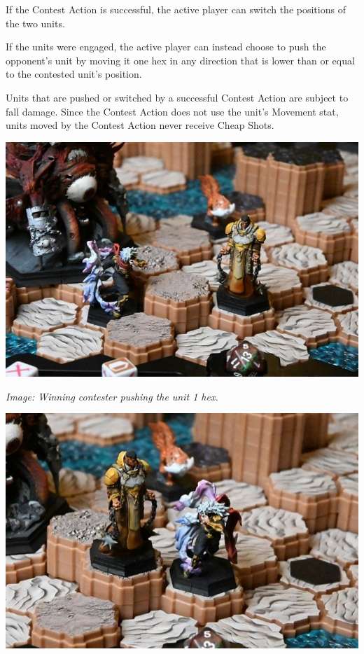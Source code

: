 \documentclass[../main.tex]{subfiles}
\begin{document}
If the Contest Action is successful, the active player can switch the positions of the two units. 

If the units were engaged, the active player can instead choose to push the opponent’s unit by moving it one hex in any direction that is lower than or equal to the contested unit’s position.

Units that are pushed or switched by a successful Contest Action are subject to fall damage. Since the Contest Action does not use the unit’s Movement stat, units moved by the Contest Action never receive Cheap Shots.

\centering
    \includegraphics[width=1\linewidth]{chapters//ActionsandEnergy/TimeStrikeWinningContest.jpg} 

\textit{Image: Winning contester pushing the unit 1 hex.}

\centering
    \includegraphics[width=1\linewidth]{chapters//ActionsandEnergy/TimeStrikeContestSwapping.jpg}
\end{document}
